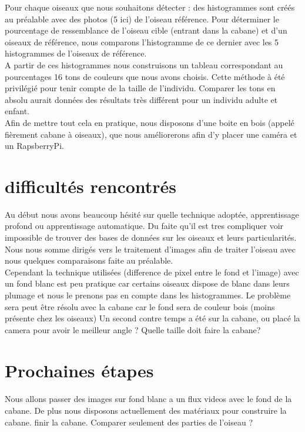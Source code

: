 \documentclass{article}
\begin{document}
Pour chaque oiseaux que nous souhaitons détecter : des histogrammes sont créés au préalable avec des photos (5 ici) de l'oiseau référence.
Pour déterminer le pourcentage de ressemblance de l'oiseau cible (entrant dans la cabane) et d'un oiseaux de référence, nous comparons l'histogramme de ce dernier avec les 5 histogrammes de l'oiseaux de référence. \\

A partir de ces histogrammes nous construisons un tableau correspondant au pourcentages 16 tons de couleurs que nous avons choisis.
Cette méthode à été privilégié pour tenir compte de la taille de l'individu.
Comparer les tons en absolu aurait données des résultats très différent pour un individu adulte et enfant. \\

Afin de mettre tout cela en pratique, nous disposons d'une boite en bois  (appelé fièrement cabane à oiseaux), que nous améliorerons afin d'y placer une caméra et un RapsberryPi.
\section{difficultés rencontrés}
Au début nous avons beaucoup hésité sur quelle technique adoptée, apprentissage profond ou apprentissage automatique. Du faite qu'il est tres compliquer voir  impossible de trouver des bases de données sur les oiseaux et leurs particularités. Nous nous somme dirigés vers le traitement d'images afin de traiter l'oiseau avec nous quelques comparaisons faite au préalable. \\ 
Cependant la technique utilisées (difference de pixel entre le fond et l'image) avec un fond blanc est peu pratique car certains oiseaux dispose de blanc dans leurs plumage et nous le prenons pas en compte dans les histogrammes. Le problème sera peut être résolu avec la cabane car le fond sera de couleur bois (moins présente chez les oiseaux)
Un second contre temps a été sur la cabane, ou placé la camera pour avoir le meilleur angle ? Quelle taille doit faire la cabane? 
\section{Prochaines étapes}
\paragraph{}
Nous allons passer des images sur fond blanc a un flux videos avec le fond de la cabane. De plus nous disposons actuellement des matériaux pour construire la cabane. finir la cabane. Comparer seulement des parties de l'oiseau ? 
\end{document}
